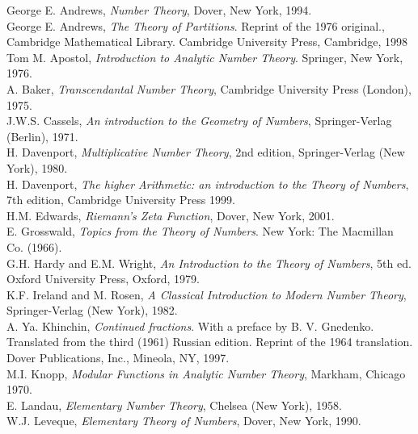 \documentclass[12pt,letterpaper]{book}
\begin{document}
\cleardoublepage
{}
\hypertarget{TOC}{}
\begin{thebibliography}{99}
 George E. Andrews, \textit{Number Theory}, Dover, New
York, 1994.\\
George E. Andrews, \textit{The Theory of Partitions}. Reprint of the 1976 original.,
Cambridge Mathematical Library. Cambridge University Press,
Cambridge, 1998\\
 Tom M. Apostol, \textit{Introduction to Analytic Number
Theory}.  Springer, New York, 1976.\\
 A. Baker, \textit{Transcendantal Number Theory},
Cambridge University Press (London), 1975.\\
 J.W.S. Cassels, \textit{An introduction to the Geometry of
Numbers}, Springer-Verlag (Berlin), 1971.\\
 H. Davenport, \textit{Multiplicative Number
Theory}, 2nd edition, Springer-Verlag (New York), 1980.\\
 H. Davenport, \textit{The higher Arithmetic:  an
introduction to the Theory of Numbers}, 7th edition, Cambridge
University Press 1999.\\
 H.M. Edwards, \textit{Riemann's Zeta Function}, Dover,
New York, 2001.\\
 E. Grosswald, \textit{Topics from the Theory of
Numbers}. New York: The Macmillan Co. (1966).\\
 G.H. Hardy and E.M. Wright, \textit{An Introduction to the
Theory of Numbers}, 5th ed. Oxford University Press, Oxford,
1979.\\
 K.F. Ireland and M. Rosen, \textit{A Classical Introduction to Modern Number
Theory}, Springer-Verlag (New York), 1982.\\
 A. Ya. Khinchin,
 \textit{Continued fractions}.
With a preface by B. V. Gnedenko. Translated from the third (1961)
Russian edition. Reprint of the 1964 translation.
Dover Publications, Inc., Mineola, NY, 1997.\\
 M.I. Knopp, \textit{Modular Functions in Analytic Number
Theory},  Markham, Chicago 1970. \\
 E. Landau, \textit{Elementary Number Theory},
Chelsea (New York), 1958.\\
 W.J. Leveque, \textit{Elementary Theory of
Numbers}, Dover, New York, 1990.\\

\end{thebibliography}
\end{document}
